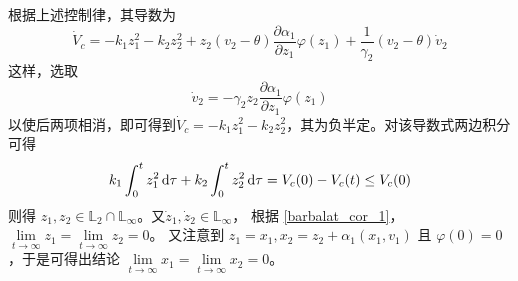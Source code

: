 根据上述控制律，其导数为
\[ \dot{V}_c = - k_1 z^2_1 - k_2 z^2_2 + z_2 (v_2 - \theta) \frac{\partial
   \alpha_1}{\partial z_1} \varphi (z_1) + \frac{1}{\gamma_2} (v_2 - \theta)
   \dot{v}_2 \]
这样，选取\[\dot{v}_2 = - \gamma_2 z_2 \frac{\partial \alpha_1}{\partial z_1}
\varphi (z_1)\]以使后两项相消，即可得到$\dot{V}_c = - k_1 z^2_1 - k_2 z^2_2$，其为负半定。对该导数式两边积分可得
\[ k_1 \int^t_0 z^2_1 \mathop{}\!\mathrm{d} \tau + k_2 \int^t_0 z^2_2 \mathop{}\!\mathrm{d} \tau = V_c (0) - V_c (t)  \leq V_c (0) \]
则得 $z_1, z_2 \in \mathbb{L}_2 \cap \mathbb{L}_{\infty}$。又$\dot{z}_1,
\dot{z}_2 \in \mathbb{L}_{\infty}$，
根据 \ref{barbalat_cor_1}，$\lim\limits_{t \rightarrow \infty} z_1 = \lim\limits_{t \rightarrow
\infty} z_2 = 0$。
又注意到 $z_1 = x_1, x_2 = z_2 + \alpha_1 (x_1, v_1)$ 且 $\varphi (0) = 0$，于是可得出结论 $\lim\limits_{t \rightarrow \infty} x_1 = \lim\limits_{t \rightarrow \infty} x_2 = 0$。

